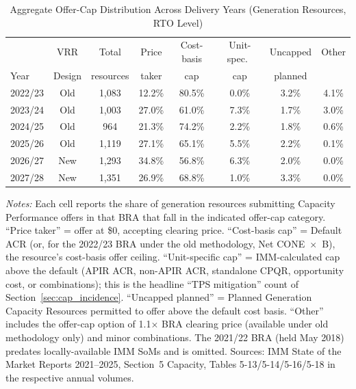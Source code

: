 \begin{table}[H]
  \centering
  \caption{Aggregate Offer-Cap Distribution Across Delivery Years
    (Generation Resources, RTO Level)}
  \label{tab:bunching}
  \small
  \begin{tabular}{lccccccc}
    \toprule
          & VRR    & Total      & Price  & Cost-basis & Unit-spec.\ & Uncapped & Other \\
    Year  & Design & resources  & taker  & cap        & cap          & planned  &       \\
    \midrule
    2022/23 & Old & 1,083 & 12.2\% & 80.5\% & 0.0\% & 3.2\% & 4.1\% \\
    2023/24 & Old & 1,003 & 27.0\% & 61.0\% & 7.3\% & 1.7\% & 3.0\% \\
    2024/25 & Old & 964 & 21.3\% & 74.2\% & 2.2\% & 1.8\% & 0.6\% \\
    2025/26 & Old & 1,119 & 27.1\% & 65.1\% & 5.5\% & 2.2\% & 0.1\% \\
    2026/27 & New & 1,293 & 34.8\% & 56.8\% & 6.3\% & 2.0\% & 0.0\% \\
    2027/28 & New & 1,351 & 26.9\% & 68.8\% & 1.0\% & 3.3\% & 0.0\% \\
    \bottomrule
  \end{tabular}
  \vspace{3pt}

  \begin{minipage}{0.96\textwidth}
    \footnotesize \textit{Notes:} Each cell reports the share of generation
    resources submitting Capacity Performance offers in that BRA that fall in
    the indicated offer-cap category. ``Price taker'' = offer at \$0,
    accepting clearing price. ``Cost-basis cap'' = Default ACR (or, for the
    2022/23 BRA under the old methodology, Net CONE~$\times$~B), the
    resource's cost-basis offer ceiling. ``Unit-specific cap'' = IMM-calculated
    cap above the default (APIR ACR, non-APIR ACR, standalone CPQR,
    opportunity cost, or combinations); this is the headline ``TPS mitigation''
    count of Section~\ref{sec:cap_incidence}. ``Uncapped planned'' = Planned
    Generation Capacity Resources permitted to offer above the default cost
    basis. ``Other'' includes the offer-cap option of 1.1$\times$ BRA clearing
    price (available under old methodology only) and minor combinations.
    The 2021/22 BRA (held May 2018) predates locally-available IMM SoMs and is
    omitted. Sources: IMM State of the Market Reports 2021--2025, Section~5
    Capacity, Tables 5-13/5-14/5-16/5-18 in the respective annual volumes.
  \end{minipage}
\end{table}
